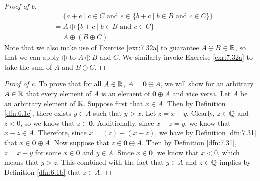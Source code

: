 \documentclass[../main.tex]{subfiles}
\begin{document}
\begin{exercise}
\begin{proof}[Proof of b]
\begin{align*}
            &= \{a+e\mid c\in C\text{ and }e\in\{b+c\mid b\in B\text{ and }c\in C\}\}\\
            &= A\oplus\{b+c\mid b\in B\text{ and }c\in C\}\\
            &= A\oplus(B\oplus C)
        \end{align*}
        Note that we also make use of Exercise \ref{exr:7.32a} to guarantee $A\oplus B\in\mathbb{R}$, so that we can apply $\oplus$ to $A\oplus B$ and $C$. We similarly invoke Exercise \ref{exr:7.32a} to take the sum of $A$ and $B\oplus C$.
    \end{proof}
    \begin{proof}[Proof of c]
        To prove that for all $A\in\mathbb{R}$, $A=\bm{0}\oplus A$, we will show for an arbitrary $A\in\mathbb{R}$ that every element of $A$ is an element of $\bm{0}\oplus A$ and vice versa. Let $A$ be an arbitrary element of $\mathbb{R}$. Suppose first that $x\in A$. Then by Definition \ref{dfn:6.1c}, there exists $y\in A$ such that $y>x$. Let $z=x-y$. Clearly, $z\in\mathbb{Q}$ and $z<0$, so we know that $z\in\bm{0}$. Additionally, since $x-z=y$, we know that $x-z\in A$. Therefore, since $x=(z)+(x-z)$, we have by Definition \ref{dfn:7.31} that $x\in\bm{0}\oplus A$. Now suppose that $z\in\bm{0}\oplus A$. Then by Definition \ref{dfn:7.31}, $z=x+y$ for some $x\in\bm{0}$ and $y\in A$. Since $x\in\bm{0}$, we know that $x<0$, which means that $y>z$. This combined with the fact that $y\in A$ and $z\in\mathbb{Q}$ implies by Definition \ref{dfn:6.1b} that $z\in A$.
    \end{proof}
\end{exercise}
\end{document}
